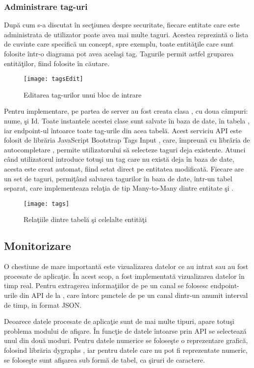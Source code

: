 \subsubsection{Administrare tag-uri}
După cum s-a discutat în secţiunea despre securitate, fiecare entitate care este administrata de utilizator poate avea mai multe taguri. Acestea reprezintă o lista de cuvinte care specifică un concept, spre exemplu, toate entităţile care sunt folosite într-o diagrama pot avea acelaşi tag. Tagurile permit astfel gruparea entităţilor, fiind folosite în căutare.
\begin{figure}[H]
	\centering
	\texttt{[image: tagsEdit]}
	\caption{Editarea tag-urilor unui bloc de intrare}
	\label{fig:tagsEdit}
\end{figure}
Pentru implementare, pe partea de server au fost creata clasa , cu doua câmpuri: nume, şi Id. Toate instantele acestei clase sunt salvate în baza de date, în tabela , iar endpoint-ul  întoarce toate tag-urile din acea tabelă. Acest serviciu API este folosit de librăria JavaScript Bootstrap Tags Input \autocite{tagsinput}, care, împreună cu librăria de autocompletare \autocite{typeahead}, permite utilizatorului să selecteze taguri deja existente. Atunci când utilizatorul introduce totuşi un tag care nu există deja în baza de date, acesta este creat automat, fiind setat direct pe entitatea modificată. Fiecare  are un set de taguri, permiţând salvarea tagurilor în baza de date, într-un tabel separat, care implementeaza relaţia de tip Many-to-Many dintre entitate şi .
\begin{figure}[H]
	\centering
	\texttt{[image: tags]}
	\caption{Relaţiile dintre tabelă  şi celelalte entităţi}
	\label{fig:tags}
\end{figure}
\subsection{Monitorizare}
O chestiune de mare importantă este vizualizarea datelor ce au intrat sau au fost procesate de aplicaţie. În acest scop, a fost implementată vizualizarea datelor în timp real. Pentru extragerea informaţiilor de pe un canal se folosesc endpoint-urile din API de la , care întorc punctele de pe un canal dintr-un anumit interval de timp, in format JSON.

Deoarece datele procesate de aplicaţie sunt de mai multe tipuri, apare totuşi problema modului de afişare. În funcţie de datele întoarse prin API se selectează unul din două moduri. Pentru datele numerice se foloseşte o reprezentare grafică, folosind librăria dygraphs \autocite{dygraphs}, iar pentru datele care nu pot fi reprezentate numeric, se foloseşte sunt afişarea sub formă de tabel, ca şiruri de caractere.

